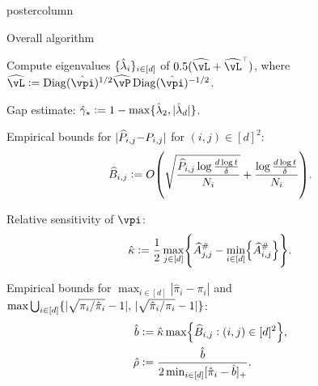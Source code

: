 \documentclass[notheorems,final]{beamer}
\newcommand\hatgap{\ensuremath{\hat{\gamma}_{\star}}}
\begin{document}
\begin{frame}{}
\begin{columns}
\begin{column}{0.24\textwidth}
\begin{beamercolorbox}[center,wd=\textwidth]{postercolumn}
\begin{minipage}[T]{.95\textwidth}
{\begin{block}{Overall algorithm}
\begin{algorithmic}[1]
                  \STATE Compute eigenvalues
                  $\{\hat\lambda_i\}_{i\in[d]}$ of
                  $0.5(\wh\vL+\wh\vL^\t)$, where $\wh\vL
                  := \Diag(\hat\vpi)^{1/2} \wh\vP \Diag(\hat\vpi)^{-1/2}$.

                  \STATE Gap estimate:
                    $\hatgap := 1 - \max\braces{ \hat\lambda_2,
                    |\hat\lambda_d| }$.

                  \STATE Empirical bounds for $|\widehat{P}_{i,j}{-}P_{i,j}|$ for $(i,j){\in}[d]^2$:
                  \begin{equation}
                    \wh{B}_{i,j}
                    :=
                    O\Parens{
                      \sqrt{\frac{\wh P_{i,j}\log\frac{d\log t}\delta}{N_i}}
                      + \frac{\log\frac{d\log t}\delta}{N_i}
                    }
                    .
                    \notag
                  \end{equation}

                  \STATE Relative sensitivity of $\vpi$:
                  \begin{equation}
                    \hat\kappa :=
                    \frac12
                    \max_{j\in[d]}
                    \Braces{
                      \wh{A}_{j,j}^\# - \min_{i\in[d]}\Braces{ \wh{A}_{i,j}^\# }
                    } 
                    .
                    \notag
                  \end{equation}

                  \STATE Empirical bounds for $\max_{i \in [d]} |\hat{\pi}_i -
                  \pi_i|$ and
                  $\max\bigcup_{i\in[d]}
                  \{
                    |\sqrt{\pi_i/\hat\pi_i}-1|,\,
                    |\sqrt{\hat\pi_i/\pi_i}-1|
                  \}$:
                  \begin{align*}
                    \hat{b}
                    & := \hat\kappa \max\Braces{
                      \wh{B}_{i,j}
                      : (i,j) \in [d]^2
                    }
                    , \\
                    \hat\rho
                    & :=
                    \frac{\hat{b}}{2\min_{i\in[d]}\brackets{\hat\pi_i-\hat{b}}_+}
                    .
                  \end{align*}


\end{algorithmic}
\end{block}}
\end{minipage}
\end{beamercolorbox}
\end{column}
\end{columns}
\end{frame}
\end{document}
